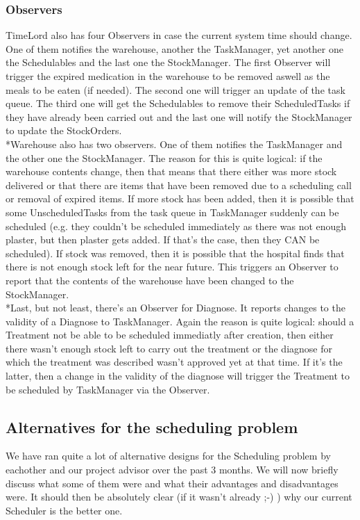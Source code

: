 \documentclass[11pt]{article}
\begin{document}
\subsubsection{Observers}
TimeLord also has four Observers in case the current system time should change. One of them notifies the warehouse, another the TaskManager, yet another one the Schedulables and the last one the StockManager. The first Observer will trigger the expired medication in the warehouse to be removed aswell as the meals to be eaten (if needed). The second one will trigger an update of the task queue. The third one will get the Schedulables to remove their ScheduledTasks if they have already been carried out and the last one will notify the StockManager to update the StockOrders.
\\*Warehouse also has two observers. One of them notifies the TaskManager and the other one the StockManager. The reason for this is quite logical: if the warehouse contents change, then that means that there either was more stock delivered or that there are items that have been removed due to a scheduling call or removal of expired items. If more stock has been added, then it is possible that some UnscheduledTasks from the task queue in TaskManager suddenly can be scheduled (e.g. they couldn't be scheduled immediately as there was not enough plaster, but then plaster gets added. If that's the case, then they CAN be scheduled). If stock was removed, then it is possible that the hospital finds that there is not enough stock left for the near future. This triggers an Observer to report that the contents of the warehouse have been changed to the StockManager.
\\*Last, but not least, there's an Observer for Diagnose. It reports changes to the validity of a Diagnose to TaskManager. Again the reason is quite logical: should a Treatment not be able to be scheduled immediatly after creation, then either there wasn't enough stock left to carry out the treatment or the diagnose for which the treatment was described wasn't approved yet at that time. If it's the latter, then a change in the validity of the diagnose will trigger the Treatment to be scheduled by TaskManager via the Observer.

\subsection{Alternatives for the scheduling problem}
We have ran quite a lot of alternative designs for the Scheduling problem by eachother and our project advisor over the past 3 months. We will now briefly discuss what some of them were and what their advantages and disadvantages were. It should then be absolutely clear (if it wasn't already ;-) ) why our current Scheduler is the better one.
\end{document}
